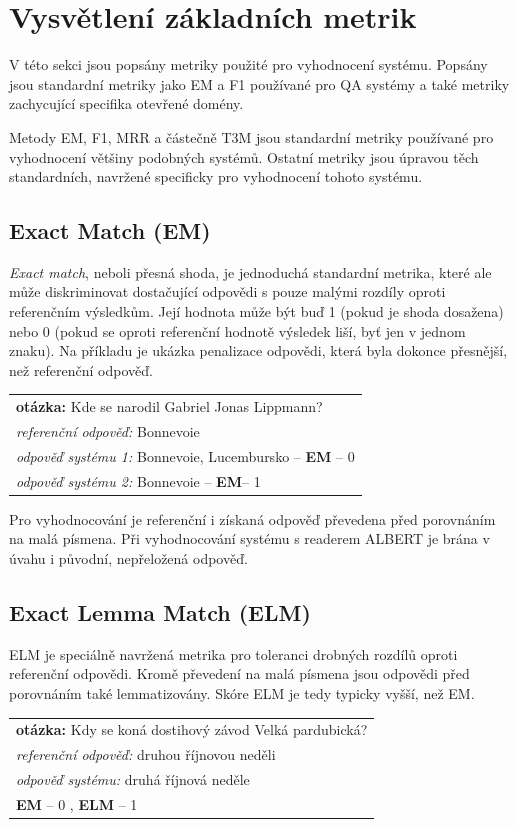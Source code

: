 \section{Vysvětlení základních metrik}
\label{metriky}
V této sekci jsou popsány metriky použité pro vyhodnocení systému. Popsány jsou standardní metriky jako EM a F1 používané pro QA systémy a také metriky zachycující specifika otevřené domény.\par
Metody EM, F1, MRR a částečně T3M jsou standardní metriky používané pro vyhodnocení většiny podobných systémů. Ostatní metriky jsou úpravou těch standardních, navržené specificky pro vyhodnocení tohoto systému.

\subsection{Exact Match (EM)}
\label{EM}
\emph{Exact match}, neboli přesná shoda, je jednoduchá standardní metrika, které ale může diskriminovat dostačující odpovědi s pouze malými rozdíly oproti referenčním výsledkům. Její hodnota může být buď 1 (pokud je shoda dosažena) nebo 0 (pokud se oproti referenční hodnotě výsledek liší, byť jen v jednom znaku). Na příkladu je ukázka penalizace odpovědi, která byla dokonce přesnější, než referenční odpověď.\par
\begin{center}
\begin{tabular}{l}
    \textbf{otázka:} Kde se narodil Gabriel Jonas Lippmann?\\
    \emph{referenční odpověď:} Bonnevoie\\
    \emph{odpověď systému 1:} Bonnevoie, Lucembursko -- \textbf{EM} -- 0\\
    \emph{odpověď systému 2:} Bonnevoie -- \textbf{EM}-- 1
\end{tabular}
\end{center}
Pro vyhodnocování je referenční i získaná odpověď převedena před porovnáním na malá písmena. Při vyhodnocování systému s readerem ALBERT je brána v úvahu i původní, nepřeložená odpověď.

\subsection{Exact Lemma Match (ELM)}
\label{ELM}
ELM je speciálně navržená metrika pro toleranci drobných rozdílů oproti referenční odpovědi. Kromě převedení na malá písmena jsou odpovědi před porovnáním také lemmatizovány. Skóre ELM je tedy typicky vyšší, než EM.
\begin{center}
\begin{tabular}{l}
    \textbf{otázka:} Kdy se koná dostihový závod Velká pardubická?\\
    \emph{referenční odpověď:} druhou říjnovou neděli\\
    \emph{odpověď systému:} druhá říjnová neděle \\
    \textbf{EM} -- 0 , \textbf{ELM} -- 1\\
\end{tabular}
\end{center}

